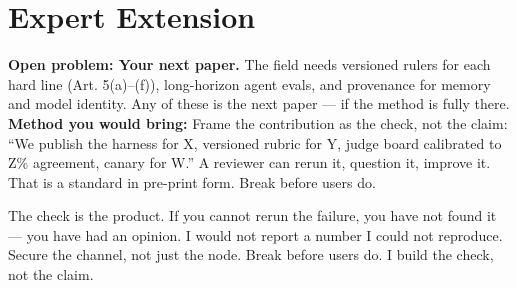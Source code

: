 \section{Expert Extension}
\rbadge
\textbf{Open problem: Your next paper.} The field needs versioned rulers for each hard line (Art. 5(a)–(f)), long-horizon agent evals, and provenance for memory and model identity. Any of these is the next paper — if the method is fully there.\\
\textbf{Method you would bring:} Frame the contribution as the check, not the claim: ``We publish the harness for X, versioned rubric for Y, judge board calibrated to Z\% agreement, canary for W.'' A reviewer can rerun it, question it, improve it. That is a standard in pre-print form. Break before users do.

\begin{checkbox}
The check is the product. If you cannot rerun the failure, you have not found it — you have had an opinion. I would not report a number I could not reproduce. Secure the channel, not just the node. Break before users do. I build the check, not the claim.
\end{checkbox}
